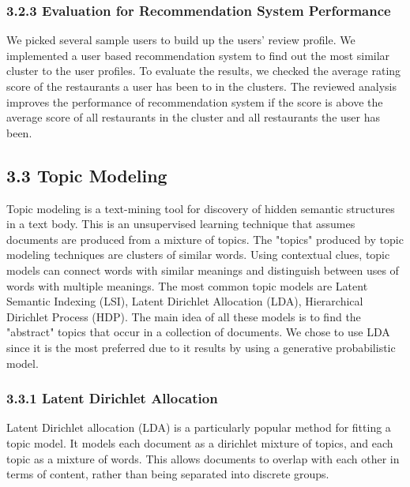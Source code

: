\documentclass{neu_handout}
\begin{document}
\subsubsection*{3.2.3 Evaluation for Recommendation System Performance}
We picked several sample users to build up the users’ review profile. We implemented a user based recommendation system to find out the most similar cluster to the user profiles. To evaluate the results, we checked the average rating score of the restaurants a user has been to in the clusters. The reviewed analysis improves the performance of recommendation system if the score is above the average score of all restaurants in the cluster and all restaurants the user has been. 
 
\subsection*{3.3 Topic Modeling}

Topic modeling is a text-mining tool for discovery of hidden semantic structures in a text body. This is an unsupervised learning technique that assumes documents are produced from a mixture of topics. The "topics" produced by topic modeling techniques are clusters of similar words. Using contextual clues, topic models can connect words with similar meanings and distinguish between uses of words with multiple meanings. 
The most common topic models are Latent Semantic Indexing (LSI), Latent Dirichlet Allocation (LDA), Hierarchical Dirichlet Process (HDP). The main idea of all these models is to find the "abstract" topics that occur in a collection of documents. We chose to use LDA since it is the most preferred due to it results by using a generative probabilistic model.

\subsubsection*{3.3.1 Latent Dirichlet Allocation}
Latent Dirichlet allocation (LDA) is a particularly popular method for fitting a topic model. It models each document as a dirichlet mixture of topics, and each topic as a mixture of words. This allows documents to overlap with each other in terms of content, rather than being separated into discrete groups.\\
\end{document}

